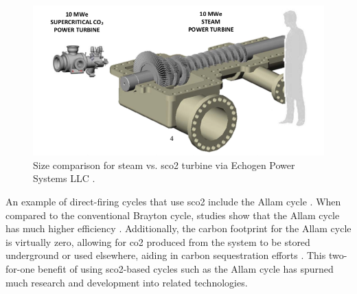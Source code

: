 \begin{figure}[h!]
\begin{center}
\includegraphics[scale=.5]{figures/steam_vs_sco2_turbine}
\end{center}
\caption{Size comparison for steam vs. \gls{sco2} turbine via Echogen Power Systems LLC \cite{commercialization}.}
\label{turbine_comp}
\end{figure}

An example of direct-firing cycles that use \gls{sco2} include the Allam cycle \cite{allam2013system}. When compared to the conventional Brayton cycle, studies show that the Allam cycle has much higher efficiency \cite{ALLAMCOMP, ALLAM20175948}. Additionally, the carbon footprint for the Allam cycle is virtually zero, allowing for \gls{co2} produced from the system to be stored underground or used elsewhere, aiding in carbon sequestration efforts \cite{cleantechnol1010022}. This two-for-one benefit of using \gls{sco2}-based cycles such as the Allam cycle has spurned much research \cite{ALLAMTech1, CHAN2021113972} and development \cite{8Rivers} into related technologies.

